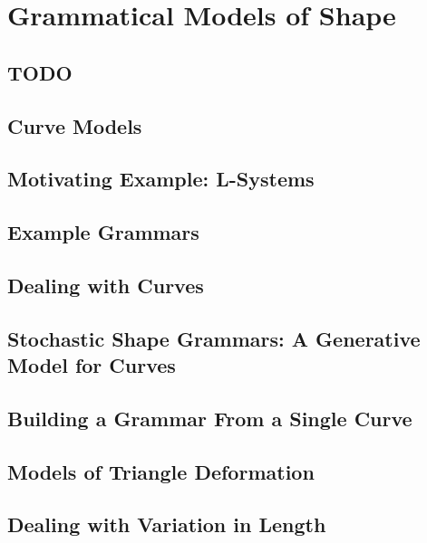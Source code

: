 \documentclass{tufte-book}
\begin{document}
\chapter{Grammatical Models of Shape}

  \section{TODO}
      

  \section{Curve Models}
      

  \section{Motivating Example: L-Systems}
    

  \section{Example Grammars}
    

  \section{Dealing with Curves}
    

  \section{Stochastic Shape Grammars: A Generative Model for Curves}
    

  \section{Building a Grammar From a Single Curve}
    

  \section{Models of Triangle Deformation}
    

  \section{Dealing with Variation in Length}
    
\end{document}
